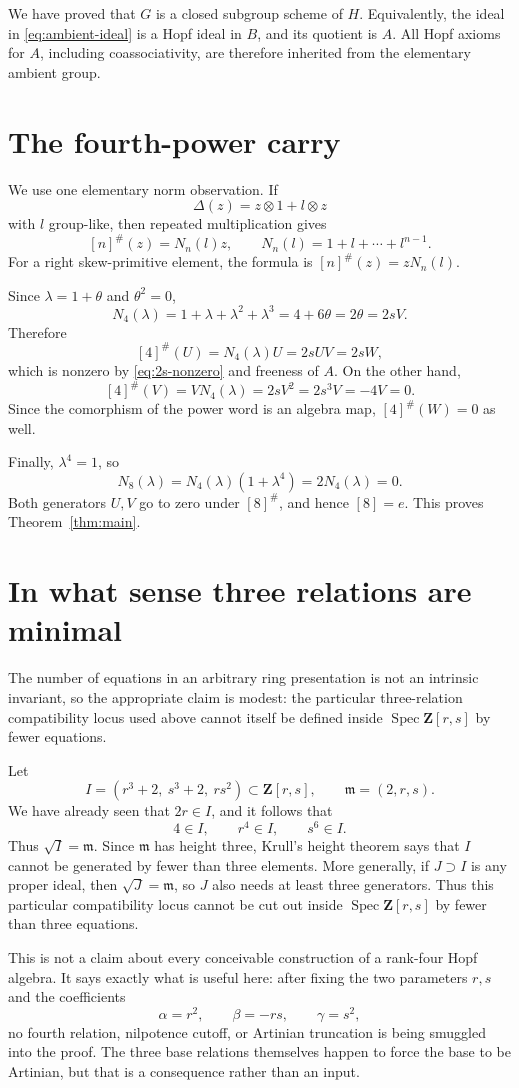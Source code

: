 \documentclass[11pt]{article}
\newcommand{\Z}{\mathbf Z}
\newcommand{\ot}{\otimes}
\newcommand{\Spec}{\operatorname{Spec}}
\theoremstyle{remark}
\begin{document}
We have proved that \(G\) is a closed subgroup scheme of \(H\).
Equivalently, the ideal in \eqref{eq:ambient-ideal} is a Hopf ideal in
\(B\), and its quotient is \(A\).  All Hopf axioms for \(A\), including
coassociativity, are therefore inherited from the elementary ambient group.

\section{The fourth-power carry}

We use one elementary norm observation.  If
\[
 \Delta(z)=z\ot1+l\ot z
\]
with \(l\) group-like, then repeated multiplication gives
\[
 [n]^\#(z)=N_n(l)z,
 \qquad
 N_n(l)=1+l+\cdots+l^{n-1}.
\]
For a right skew-primitive element, the formula is
\([n]^\#(z)=zN_n(l)\).

Since \(\lambda=1+\theta\) and \(\theta^2=0\),
\[
 N_4(\lambda)
 =1+\lambda+\lambda^2+\lambda^3
 =4+6\theta
 =2\theta
 =2sV.
\]
Therefore
\[
 [4]^\#(U)=N_4(\lambda)U=2sUV=2sW,
\]
which is nonzero by \eqref{eq:2s-nonzero} and freeness of \(A\).  On the
other hand,
\[
 [4]^\#(V)=VN_4(\lambda)
 =2sV^2=2s^3V=-4V=0.
\]
Since the comorphism of the power word is an algebra map,
\([4]^\#(W)=0\) as well.

Finally, \(\lambda^4=1\), so
\[
 N_8(\lambda)
 =N_4(\lambda)(1+\lambda^4)
 =2N_4(\lambda)=0.
\]
Both generators \(U,V\) go to zero under \([8]^\#\), and hence
\([8]=e\).  This proves Theorem~\ref{thm:main}.

\section{In what sense three relations are minimal}

The number of equations in an arbitrary ring presentation is not an
intrinsic invariant, so the appropriate claim is modest: the particular
three-relation compatibility locus used above cannot itself be defined
inside \(\Spec\Z[r,s]\) by fewer equations.

Let
\[
 I=(r^3+2,\ s^3+2,\ rs^2)\subset\Z[r,s],
 \qquad
 \mathfrak m=(2,r,s).
\]
We have already seen that \(2r\in I\), and it follows that
\[
 4\in I,\qquad r^4\in I,\qquad s^6\in I.
\]
Thus \(\sqrt I=\mathfrak m\).  Since \(\mathfrak m\) has height three,
Krull's height theorem says that \(I\) cannot be generated by fewer than
three elements.  More generally, if \(J\supset I\) is any proper ideal,
then \(\sqrt J=\mathfrak m\), so \(J\) also needs at least three generators.
Thus this particular compatibility locus cannot be cut out inside
\(\Spec\Z[r,s]\) by fewer than three equations.

This is not a claim about every conceivable construction of a rank-four
Hopf algebra.  It says exactly what is useful here: after fixing the two
parameters \(r,s\) and the coefficients
\[
 \alpha=r^2,\qquad \beta=-rs,\qquad \gamma=s^2,
\]
no fourth relation, nilpotence cutoff, or Artinian truncation is being
smuggled into the proof.  The three base relations themselves
happen to force the base to be Artinian, but that is a consequence rather
than an input.
\end{document}
